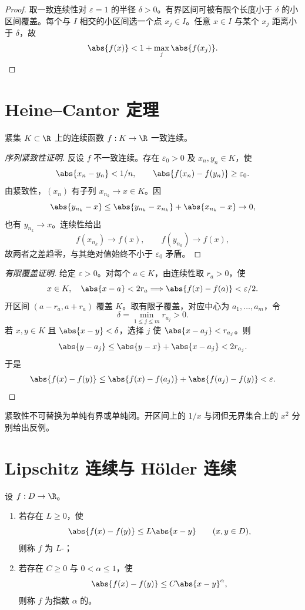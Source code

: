 \begin{proof}
取一致连续性对 \(\varepsilon=1\) 的半径 \(\delta>0\)。有界区间可被有限个长度小于 \(\delta\) 的小区间覆盖。每个与 \(I\) 相交的小区间选一个点 \(x_j\in I\)。任意 \(x\in I\) 与某个 \(x_j\) 距离小于 \(\delta\)，故
\[
 \abs{f(x)}<1+\max_j\abs{f(x_j)}.
\]
\end{proof}

\section{Heine--Cantor 定理}

\begin{theorem}
紧集 \(K\subset\R\) 上的连续函数 \(f:K\to\R\) 一致连续。
\end{theorem}

\begin{proof}[序列紧致性证明]
反设 \(f\) 不一致连续。存在 \(\varepsilon_0>0\) 及 \(x_n,y_n\in K\)，使
\[
 \abs{x_n-y_n}<1/n,\qquad
 \abs{f(x_n)-f(y_n)}\ge\varepsilon_0.
\]
由紧致性，\((x_n)\) 有子列 \(x_{n_k}\to x\in K\)。因
\[
 \abs{y_{n_k}-x}
 \le\abs{y_{n_k}-x_{n_k}}+\abs{x_{n_k}-x}\to0,
\]
也有 \(y_{n_k}\to x\)。连续性给出
\[
 f(x_{n_k})\to f(x),\qquad f(y_{n_k})\to f(x),
\]
故两者之差趋零，与其绝对值始终不小于 \(\varepsilon_0\) 矛盾。
\end{proof}

\begin{proof}[有限覆盖证明]
给定 \(\varepsilon>0\)。对每个 \(a\in K\)，由连续性取 \(r_a>0\)，使
\[
 x\in K,\quad\abs{x-a}<2r_a
 \Longrightarrow\abs{f(x)-f(a)}<\varepsilon/2.
\]
开区间 \((a-r_a,a+r_a)\) 覆盖 \(K\)。取有限子覆盖，对应中心为 \(a_1,\ldots,a_m\)，令
\[
 \delta=\min_{1\le j\le m}r_{a_j}>0.
\]
若 \(x,y\in K\) 且 \(\abs{x-y}<\delta\)，选择 \(j\) 使 \(\abs{x-a_j}<r_{a_j}\)。则
\[
 \abs{y-a_j}
 \le\abs{y-x}+\abs{x-a_j}
 <2r_{a_j}.
\]
于是
\[
 \abs{f(x)-f(y)}
 \le\abs{f(x)-f(a_j)}+\abs{f(a_j)-f(y)}
 <\varepsilon.
\]
\end{proof}

紧致性不可替换为单纯有界或单纯闭。开区间上的 \(1/x\) 与闭但无界集合上的 \(x^2\) 分别给出反例。

\section{Lipschitz 连续与 Hölder 连续}

\begin{definition}
设 \(f:D\to\R\)。
\begin{enumerate}
 \item 若存在 \(L\ge0\)，使
 \[
  \abs{f(x)-f(y)}\le L\abs{x-y}\qquad(x,y\in D),
 \]
 则称 \(f\) 为 \(L\)-；
 \item 若存在 \(C\ge0\) 与 \(0<\alpha\le1\)，使
 \[
  \abs{f(x)-f(y)}\le C\abs{x-y}^{\alpha},
 \]
 则称 \(f\) 为指数 \(\alpha\) 的。
\end{enumerate}
\end{definition}

